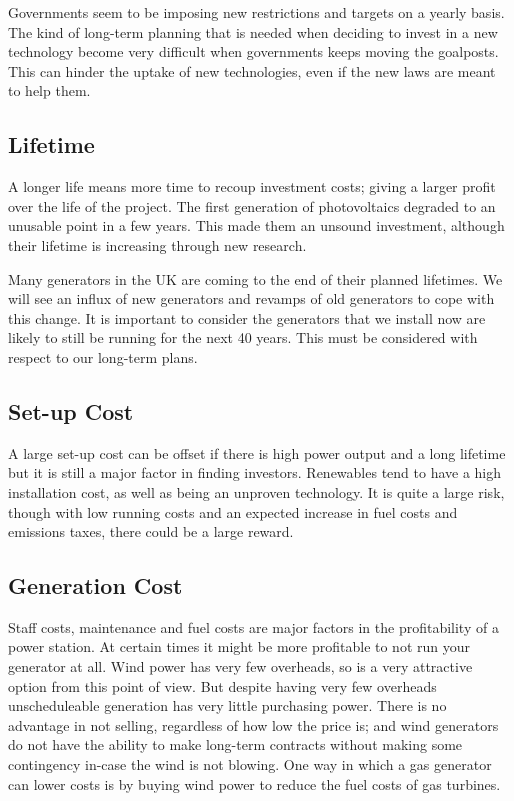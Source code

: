 \documentclass[a4paper,oneside,12pt]{report}
\begin{document}
Governments seem to be imposing new restrictions and targets on a yearly basis. The kind of long-term planning that is needed when deciding to invest in a new technology become very difficult when governments keeps moving the goalposts. This can hinder the uptake of new technologies, even if the new laws are meant to help them.

\subsection{Lifetime}

A longer life means more time to recoup investment costs; giving a larger profit over the life of the project. The first generation of photovoltaics degraded to an unusable point in a few years. This made them an unsound investment, although their lifetime is increasing through new research.

Many generators in the UK are coming to the end of their planned lifetimes. We will see an influx of new generators and revamps of old generators to cope with this change. It is important to consider the generators that we install now are likely to still be running for the next 40 years. This must be considered with respect to our long-term plans.

\subsection{Set-up Cost}

A large set-up cost can be offset if there is high power output and a long lifetime but it is still a major factor in finding investors. Renewables tend to have a high installation cost, as well as being an unproven technology. It is quite a large risk, though with low running costs and an expected increase in fuel costs and emissions taxes, there could be a large reward.

\subsection{Generation Cost}

Staff costs, maintenance and fuel costs are major factors in the profitability of a power station. At certain times it might be more profitable to not run your generator at all. Wind power has very few overheads, so is a very attractive option from this point of view. But despite having very few overheads unscheduleable generation has very little purchasing power. There is no advantage in not selling, regardless of how low the price is; and wind generators do not have the ability to make long-term contracts without making some contingency in-case the wind is not blowing. One way in which a gas generator can lower costs is by buying wind power to reduce the fuel costs of gas turbines.
\end{document}
